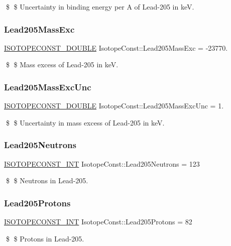 \$ \$ Uncertainty in binding energy per A of Lead-\/205 in keV. \mbox{\label{group___isotope_const-_lead-_pb205_ga4503a9b22a6f4d349a4c3b1240a427e1}} 
\subsubsection{\texorpdfstring{Lead205\+Mass\+Exc}{Lead205MassExc}}
{\footnotesize\ttfamily \mbox{\hyperlink{group___isotope_const-_macros_ga8f45a7272ce02c0b4c65c44636ed719a}{I\+S\+O\+T\+O\+P\+E\+C\+O\+N\+S\+T\+\_\+\+D\+O\+U\+B\+LE}} Isotope\+Const\+::\+Lead205\+Mass\+Exc = -\/23770.}

\$ \$ Mass excess of Lead-\/205 in keV. \mbox{\label{group___isotope_const-_lead-_pb205_gad68781d2962cfd921611a23c75957a4b}} 
\subsubsection{\texorpdfstring{Lead205\+Mass\+Exc\+Unc}{Lead205MassExcUnc}}
{\footnotesize\ttfamily \mbox{\hyperlink{group___isotope_const-_macros_ga8f45a7272ce02c0b4c65c44636ed719a}{I\+S\+O\+T\+O\+P\+E\+C\+O\+N\+S\+T\+\_\+\+D\+O\+U\+B\+LE}} Isotope\+Const\+::\+Lead205\+Mass\+Exc\+Unc = 1.}

\$ \$ Uncertainty in mass excess of Lead-\/205 in keV. \mbox{\label{group___isotope_const-_lead-_pb205_ga2bd4facd0e7f5d7599adb8112dec66d5}} 
\subsubsection{\texorpdfstring{Lead205\+Neutrons}{Lead205Neutrons}}
{\footnotesize\ttfamily \mbox{\hyperlink{group___isotope_const-_macros_ga5f18360b3e99483a35c32d789e62621c}{I\+S\+O\+T\+O\+P\+E\+C\+O\+N\+S\+T\+\_\+\+I\+NT}} Isotope\+Const\+::\+Lead205\+Neutrons = 123}

\$ \$ Neutrons in Lead-\/205. \mbox{\label{group___isotope_const-_lead-_pb205_ga06fb81afae2e3bfcdff5534315df15ac}} 
\subsubsection{\texorpdfstring{Lead205\+Protons}{Lead205Protons}}
{\footnotesize\ttfamily \mbox{\hyperlink{group___isotope_const-_macros_ga5f18360b3e99483a35c32d789e62621c}{I\+S\+O\+T\+O\+P\+E\+C\+O\+N\+S\+T\+\_\+\+I\+NT}} Isotope\+Const\+::\+Lead205\+Protons = 82}

\$ \$ Protons in Lead-\/205. 